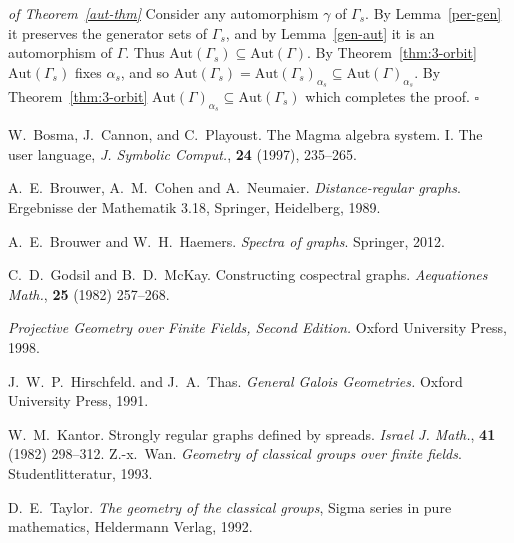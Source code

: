 \documentclass[12pt]{article}
\newenvironment{proof}{\noindent{\bf Proof}\hspace{0.5em}}
    { \null  \hfill $\square$ \par}
\newcommand\red[1]{{\color{red} #1}}
\begin{document}
\begin{proof}\emph{ of Theorem~\ref{aut-thm}}
Consider any automorphism $\gamma$ of  $\Gamma_s$.  By Lemma~\ref{per-gen}  it preserves the generator sets of $\Gamma_s$, and by Lemma~\ref{gen-aut}  it is an automorphism of $\Gamma$.  Thus $\mbox{Aut}(\Gamma_s)\subseteq\mbox{Aut}(\Gamma)$. By Theorem~\ref{thm:3-orbit} $\mbox{Aut}(\Gamma_s)$ fixes  $\alpha_s$, and so $\mbox{Aut}(\Gamma_s)=\mbox{Aut}(\Gamma_s)_{\alpha_s}\subseteq \mbox{Aut}(\Gamma)_{\alpha_s}$. By Theorem~\ref{thm:3-orbit} $\mbox{Aut}(\Gamma)_{\alpha_s}\subseteq\mbox{Aut}(\Gamma_s)$ which completes the proof.
\end{proof}






\begin{thebibliography}{999}


%
%

 W.~Bosma, J.~Cannon, and C.~Playoust. The Magma algebra system. I. The user language, {\em J. Symbolic Comput.}, {\bf 24} (1997), 235--265. 

 A.~E.~Brouwer, A.~M.~Cohen and A.~Neumaier. {\em Distance-regular graphs}. Ergebnisse der Mathematik 3.18, Springer, Heidelberg, 1989. 

 A.~E.~Brouwer and W.~H.~Haemers. {\em Spectra of graphs}. Springer, 2012.


 C.~D.~Godsil and B.~D.~McKay. Constructing cospectral graphs. {\em   Aequationes Math.}, {\bf  25} (1982) 257--268. 

  {\em Projective Geometry over Finite
Fields, Second Edition.} Oxford University Press, 1998.


 J.~W.~P.~Hirschfeld. and J.~A.~Thas. {\em General
  Galois Geometries.} Oxford University
  Press, 1991.

 W.~M.~Kantor. Strongly regular graphs defined by spreads. {\em Israel J. Math.}, {\bf 41} (1982) 298--312.
 Z.-x.~Wan. \emph{Geometry of classical groups over finite fields}. Studentlitteratur, 1993.

   D.~E.~Taylor.
  {\em The geometry of the classical groups}, Sigma series in pure mathematics, Heldermann Verlag, 1992.

  \end{thebibliography}
\end{document}
